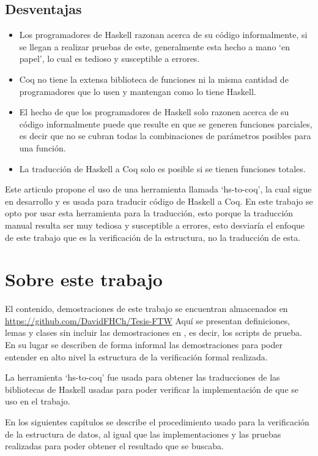 \subsection{Desventajas}
\begin{itemize}
    \item Los programadores de Haskell razonan acerca de su código informalmente, si se llegan a
    realizar pruebas de este, generalmente esta hecho a mano `en papel', lo cual es tedioso y
    susceptible a errores.
    \item Coq no tiene la extensa biblioteca de funciones ni la misma cantidad de programadores
    que lo usen y mantengan como lo tiene Haskell.
    \item El hecho de que los programadores de Haskell solo razonen acerca de su código
    informalmente puede que resulte en que se generen funciones parciales, es decir que no se
    cubran todas la combinaciones de parámetros posibles para una funci\'on.
    \item La traducci\'on de Haskell a Coq solo es posible si se tienen funciones totales.
\end{itemize}

Este articulo propone el uso de una herramienta llamada `hs-to-coq', la cual sigue en desarrollo y
es usada para traducir código de Haskell a Coq. En este trabajo se opto por usar esta herramienta
para la traducci\'on, esto porque la traducci\'on manual resulta ser muy tediosa y susceptible a
errores, esto desviaría el enfoque de este trabajo que es la verificaci\'on de la estructura, no la
traducci\'on de esta.

\section {Sobre este trabajo}
El contenido, demostraciones de este trabajo se encuentran almacenados en
\url{https://github.com/DavidFHCh/Tesis-FTW} Aqu\'i se presentan definiciones, lemas y clases sin
incluir las demostraciones en {\coq}, es decir, los scripts de prueba. En su lugar se describen de
forma informal las demostraciones para poder entender en alto nivel la estructura de la
verificaci\'on formal realizada.

La herramienta `hs-to-coq' fue usada para obtener las traducciones de las bibliotecas de Haskell
usadas para poder verificar la implementación de {\arns} que se uso en el trabajo.

En los siguientes capítulos se describe el procedimiento usado para la verificaci\'on de la
estructura de datos, al igual que las implementaciones y las pruebas realizadas para poder obtener
el resultado que se buscaba.
